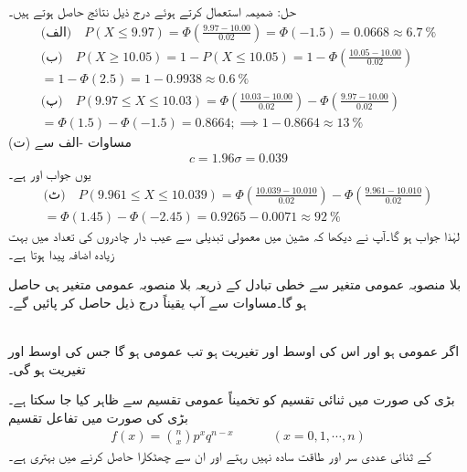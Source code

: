 حل:\quad
 ضمیمہ  استعمال کرتے ہوئے درج ذیل نتائج حاصل ہوتے ہیں۔
\begin{align*}
\text{(الف)}\quad P(X\le 9.97)=\Phi(\frac{9.97-10.00}{0.02})=\Phi(-1.5)=0.0668\approx \SI{6.7}{\percent}\\
\text{(ب)} \quad P(X\ge 10.05)=1-P(X\le 10.05)=1-\Phi(\frac{10.05-10.00}{0.02})\\
=1-\Phi(2.5)=1-0.9938\approx \SI{0.6}{\percent}\\
\text{(پ)}  \quad P(9.97\le X\le 10.03)=\Phi(\frac{10.03-10.00}{0.02})-\Phi(\frac{9.97-10.00}{0.02})\\
=\Phi(1.5)-\Phi(-1.5)=0.8664; \implies 1-0.8664\approx \SI{13}{\percent}
\end{align*}
(ت) مساوات -الف سے
\begin{align*}
c=1.96\sigma=0.039
\end{align*}
یوں جواب  اور  ہے۔\\
\begin{align*}
\text{(ٹ)} \quad P(9.961\le X\le 10.039)=\Phi(\frac{10.039-10.010}{0.02})-\Phi(\frac{9.961-10.010}{0.02})\\
=\Phi(1.45)-\Phi(-2.45)=0.9265-0.0071\approx \SI{92}{\percent}
\end{align*}
لہٰذا جواب  ہو گا۔آپ نے دیکھا کہ مشین میں معمولی تبدیلی سے عیب دار چادروں کی تعداد میں بہت زیادہ اضافہ پیدا ہوتا ہے۔


بلا منصوبہ عمومی متغیر سے خطی تبادل کے ذریعہ بلا منصوبہ عمومی متغیر  ہی حاصل ہو گا۔مساوات  سے آپ یقیناً درج ذیل حاصل کر پائیں گے۔

\quad {}\\
اگر  عمومی ہو اور اس کی اوسط  اور تغیریت  ہو تب  عمومی ہو گا جس کی اوسط  اور تغیریت  ہو گی۔

بڑی  کی صورت میں ثنائی تقسیم کو تخمیناً عمومی تقسیم سے ظاہر کیا جا سکتا ہے۔بڑی  کی صورت میں تفاعل تقسیم
\begin{align}\label{مساوات_شماریات_ثنائی_مشکل}
f(x)=\binom{n}{x}p^xq^{n-x}\quad\quad\quad (x=0,1,\cdots,n)
\end{align} 
کے ثنائی عددی سر اور طاقت سادہ نہیں رہتے اور ان سے چھٹکارا  حاصل کرنے میں بہتری ہے۔

